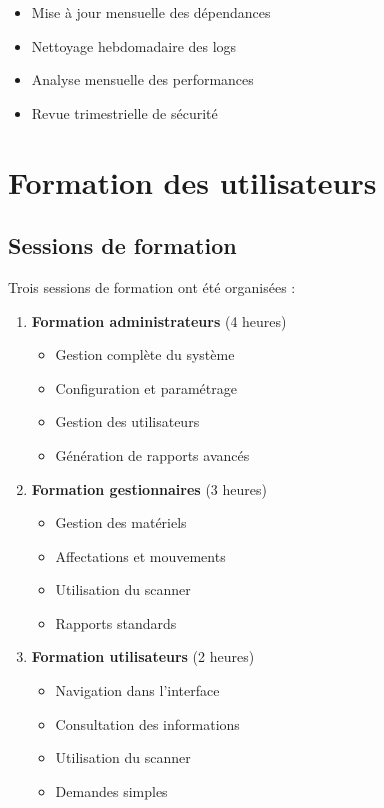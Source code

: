 \begin{itemize}
    \item Mise à jour mensuelle des dépendances
    \item Nettoyage hebdomadaire des logs
    \item Analyse mensuelle des performances
    \item Revue trimestrielle de sécurité
\end{itemize}

\section{Formation des utilisateurs}

\subsection{Sessions de formation}

Trois sessions de formation ont été organisées :

\begin{enumerate}
    \item \textbf{Formation administrateurs} (4 heures)
    \begin{itemize}
        \item Gestion complète du système
        \item Configuration et paramétrage
        \item Gestion des utilisateurs
        \item Génération de rapports avancés
    \end{itemize}
    
    \item \textbf{Formation gestionnaires} (3 heures)
    \begin{itemize}
        \item Gestion des matériels
        \item Affectations et mouvements
        \item Utilisation du scanner
        \item Rapports standards
    \end{itemize}
    
    \item \textbf{Formation utilisateurs} (2 heures)
    \begin{itemize}
        \item Navigation dans l'interface
        \item Consultation des informations
        \item Utilisation du scanner
        \item Demandes simples
    \end{itemize}
\end{enumerate}

